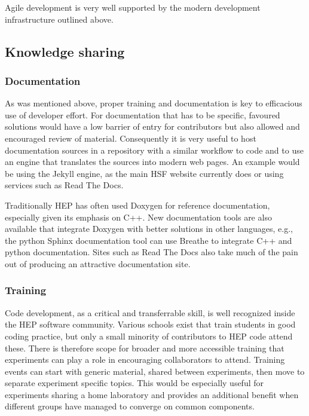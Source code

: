 \documentclass[12pt,a4paper]{article}
\begin{document}
Agile development is very well supported by the modern development
infrastructure outlined above.~

\hypertarget{knowledge-sharing}{%
\subsection{Knowledge sharing}\label{knowledge-sharing}}

\hypertarget{documentation}{%
\subsubsection{Documentation}\label{documentation}}

As was mentioned above, proper training and documentation is key to
efficacious use of developer effort. For documentation that has to be
specific, favoured solutions would have a low barrier of entry for
contributors but also allowed and encouraged review of material.
Consequently it is very useful to host documentation sources in a
repository with a similar workflow to code and to use an engine that
translates the sources into modern web pages. An example would be using
the Jekyll engine, as the main HSF website currently does or using
services such as Read The Docs.

Traditionally HEP has often used Doxygen for reference documentation,
especially given its emphasis on C++. New documentation tools are also
available that integrate Doxygen with better solutions in other
languages, e.g., the python Sphinx documentation tool can use Breathe to
integrate C++ and python documentation. Sites such as Read The Docs also
take much of the pain out of producing an attractive documentation site.

\hypertarget{training}{%
\subsubsection{Training}\label{training}}

Code development, as a critical and transferrable skill, is well
recognized inside the HEP software community. Various schools exist that
train students in good coding practice, but only a small minority of
contributors to HEP code attend these. There is therefore scope for
broader and more accessible training that experiments can play a role in
encouraging collaborators to attend. Training events can start with
generic material, shared between experiments, then move to separate
experiment specific topics. This would be especially useful for
experiments sharing a home laboratory and provides an additional benefit
when different groups have managed to converge on common components.
\end{document}
